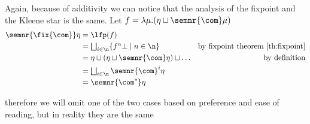 Again, because of additivity we can notice that the analysis of the
fixpoint and the Kleene star is the same. Let
\(f = \lambda \mu . (\eta \sqcup \semnr{\com}\mu)\)
\begin{align*}
  \semnr{\fix{\com}}\eta & = \lfp(f) \\
                         & = \textstyle\bigsqcup_{i\in\n}\{f^n\bot \mid n \in \n\} & \text{by fixpoint theorem \ref{th:fixpoint}}\\
                         & = \eta \sqcup (\eta \sqcup \semnr{\com}\eta) \sqcup \dots & \text{by definition}\\
                         & = \textstyle\bigsqcup_{i\in\n}\semnr{\com}^i\eta \\
                         & = \semnr{\com^*}\eta
\end{align*}

therefore we will omit one of the two cases based on preference and
ease of reading, but in reality they are the same
